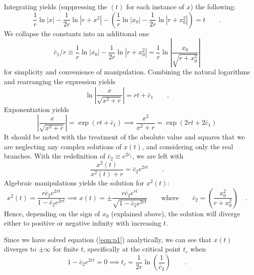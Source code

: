 \documentclass[draft]{agujournal2019}
\begin{document}
Integrating yields (suppressing the $(t)$ for each instance of $x$) the following:
\begin{equation*}
    \frac{1}{r} \ln{|x|} - \frac{1}{2r} \ln{|r+x^2|} - \left(\frac{1}{r} \ln{|x_0|} - \frac{1}{2r} \ln{|r+x_0^2|}\right) = t \qquad .
\end{equation*}
We collapse the constants into an additional one 
\begin{equation*}
    \bar{c}_1/r \equiv \frac{1}{r} \ln{|x_0|} - \frac{1}{2r} \ln{|r+x_0^2|} = \frac{1}{r} \ln{\left|\frac{x_0}{\sqrt{r+x_0^2}}\right|}
\end{equation*}
for simplicity and convenience of manipulation. Combining the natural logarithms and rearranging the expression yields
\begin{equation*}
    \ln{\left|\frac{x}{\sqrt{x^2+r}}\right|} = rt + \bar c_1 \qquad .
\end{equation*}
Exponentiation yields 
\begin{equation*}
    \left|\frac{x}{\sqrt{x^2+r}}\right|=\exp(rt+\bar c_1) \implies \frac{x^2}{x^2+r}=\exp(2rt+2\bar c_1) 
\end{equation*}
It should be noted with the treatment of the absolute value and squares that we are neglecting any complex solutions of $x(t)$, and considering only the real branches. With the redefinition of $\bar c_2 \equiv e^{2\bar c_1} $, we are left with 
\begin{equation*}
    \frac{x^2(t)}{x^2(t)+r} = \bar c_2 e^{2rt} \qquad .
\end{equation*}
Algebraic manipulations yields the solution for $x^2(t)$:
\begin{equation}
    \label{eqn:p1_soln}
    x^2(t) = \frac{r \bar c_2 e^{2rt}}{1 - \bar c_2 e^{2rt}} \implies x(t) = \pm \frac{r\bar c_2 e^{rt}}{\sqrt{1 - \bar c_2 e^{2rt}}} \qquad \mathrm{where} \qquad \bar c_2 = \left(\frac{x_0^2}{r+x_0^2}\right) \quad .
\end{equation}
Hence, depending on the sign of $x_0$ (explained above), the solution will diverge either to positive or negative infinity with increasing $t$. 
\par
Since we have solved equation (\ref{eqn:p1}) analytically, we can see that $x(t)$ diverges to $\pm\infty$ for finite $t$, specifically at the critical point $t_c$ when 
\begin{equation*}
    1-\bar c_2 e^{2rt} = 0 \implies t_c = \frac{1}{2r} \ln{\left(\frac{1}{\bar c_2}\right)} \qquad .
\end{equation*}
\end{document}
